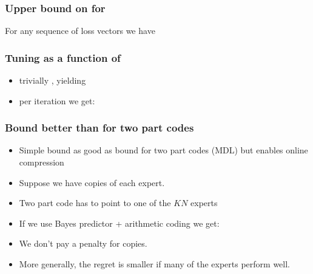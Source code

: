 \documentclass[handout]{beamer}
\begin{document}
\begin{frame}
\frametitle{Upper bound on  for \ouralg}
\begin{lemma} 
For any sequence of loss vectors 
we have
\end{lemma}
\end{frame}

\begin{frame}
\frametitle{Tuning \R{$\eta$} as a function of }
\begin{itemize}
\item trivially , yielding
\item per iteration we get:
\end{itemize}
\end{frame}


\begin{frame}
\frametitle{Bound better than for two part codes}
\begin{itemize}
\item
Simple bound as good as bound for two part codes (MDL) 
but enables online compression
\item Suppose we have  copies of each expert.
\item Two part code has to point to one of the $KN$ experts
\item If we use Bayes predictor + arithmetic coding we get:
\item We don't pay a penalty for copies.
\item More generally, the regret is smaller if many of the experts perform well.
\end{itemize}
\end{frame}


\iffalse %

\fi %
\end{document}

